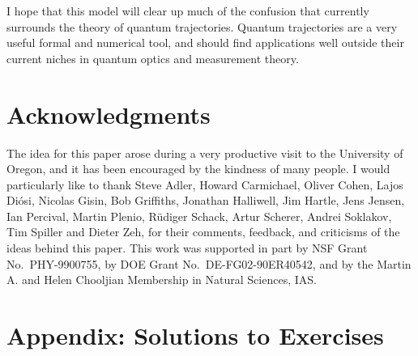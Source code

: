 \documentclass[12pt]{article}
\begin{document}
I hope that this model will clear up much of the confusion that currently
surrounds the theory of quantum trajectories.  Quantum trajectories are
a very useful formal and numerical tool, and should find applications well
outside their current niches in quantum optics and measurement theory.

\section*{Acknowledgments}

The idea for this paper arose during a very productive visit to the University
of Oregon, and it has been encouraged by the kindness of many people.
I would particularly like to thank Steve Adler, Howard Carmichael,
Oliver Cohen, Lajos Di\'osi, Nicolas Gisin, Bob Griffiths, Jonathan Halliwell,
Jim Hartle, Jens Jensen, Ian Percival, Martin Plenio, R\"udiger Schack,
Artur Scherer, Andrei Soklakov, Tim Spiller and Dieter Zeh, for
their comments, feedback, and criticisms of the ideas behind this paper.
This work was supported in part by NSF Grant No.~PHY-9900755, by
DOE Grant No.~DE-FG02-90ER40542, and by the Martin A. and Helen Chooljian
Membership in Natural Sciences, IAS.

\section*{Appendix:  Solutions to Exercises}
\end{document}
